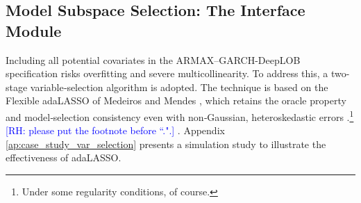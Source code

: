 \documentclass[10pt,a4paper,oneside]{article}
\newcommand{\rh}[1]{\textcolor{blue}{\textsf{[RH: #1]}}}
\providecommand{\DIFaddtex}[1]{{\protect\color{blue} \sf #1}} %
\providecommand{\DIFdeltex}[1]{{\protect\color{red} \scriptsize #1}} %
\providecommand{\DIFaddbegin}{} %
\providecommand{\DIFaddend}{} %
\providecommand{\DIFdelbegin}{} %
\providecommand{\DIFdelend}{} %
\providecommand{\DIFadd}[1]{\texorpdfstring{\DIFaddtex{#1}}{#1}} %
\providecommand{\DIFdel}[1]{\texorpdfstring{\DIFdeltex{#1}}{}} %
\newcommand{\DIFscaledelfig}{0.5}
\newlength{\DIFdelgraphicswidth} %
\newlength{\DIFdelgraphicsheight} %
\newcommand{\DIFaddincludegraphics}[2][]{{\color{blue}\fbox{\DIFOincludegraphics[#1]{#2}}}} %
\newcommand{\DIFdelincludegraphics}[2][]{%
\sbox{\DIFdelgraphicsbox}{\DIFOincludegraphics[#1]{#2}}%
\settoboxwidth{\DIFdelgraphicswidth}{\DIFdelgraphicsbox} %
\settoboxtotalheight{\DIFdelgraphicsheight}{\DIFdelgraphicsbox} %
\scalebox{\DIFscaledelfig}{%
\parbox[b]{\DIFdelgraphicswidth}{\usebox{\DIFdelgraphicsbox}\\[-\baselineskip] \rule{\DIFdelgraphicswidth}{0em}}\llap{\resizebox{\DIFdelgraphicswidth}{\DIFdelgraphicsheight}{%
\setlength{\unitlength}{\DIFdelgraphicswidth}%
\begin{picture}(1,1)%
\thicklines\linethickness{2pt} %
{\color[rgb]{1,0,0}\put(0,0){\framebox(1,1){}}}%
{\color[rgb]{1,0,0}\put(0,0){\line( 1,1){1}}}%
{\color[rgb]{1,0,0}\put(0,1){\line(1,-1){1}}}%
\end{picture}%
}\hspace*{3pt}}} %
} %
\DeclareRobustCommand{\DIFaddbegin}{\DIFOaddbegin \let\includegraphics\DIFaddincludegraphics} %
\DeclareRobustCommand{\DIFaddend}{\DIFOaddend \let\includegraphics\DIFOincludegraphics} %
\DeclareRobustCommand{\DIFdelbegin}{\DIFOdelbegin \let\includegraphics\DIFdelincludegraphics} %
\DeclareRobustCommand{\DIFdelend}{\DIFOaddend \let\includegraphics\DIFOincludegraphics} %
\begin{document}






\subsection{Model Subspace Selection: The Interface Module}
\label{subsec:covariates_selection}

Including all potential covariates in the ARMAX–GARCH-DeepLOB specification risks overfitting and severe multicollinearity. To address this, a two-stage variable‐selection algorithm is adopted. The technique is based on the Flexible adaLASSO of Medeiros and Mendes \cite{MEDEIROS2016255}, which retains the oracle property and model‐selection consistency even with non‐Gaussian, heteroskedastic errors\DIFdelbegin \DIFdel{.}\DIFdelend \footnote{Under some regularity conditions, of course.}\DIFdelbegin \DIFdel{\rh{please put the footnote before ``.".} }\DIFdelend \DIFaddbegin \DIFadd{. }\DIFaddend Appendix \ref{ap:case_study_var_selection} presents a simulation study to illustrate the effectiveness of adaLASSO.
\end{document}
